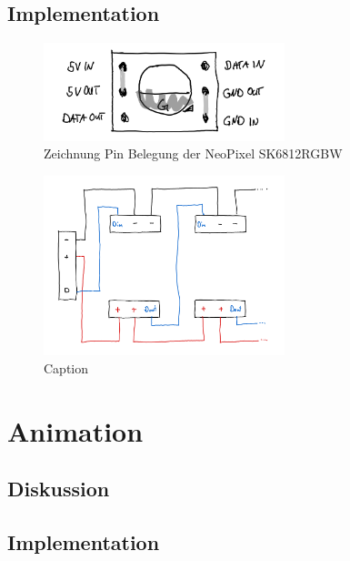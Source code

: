     \subsection{Implementation}

        \begin{figure}[h]
            \begin{center}
                \includegraphics[width=7cm]{media/03_technical_implementation/leds_2.png}
            \end{center}
            \caption{Zeichnung Pin Belegung der NeoPixel SK6812RGBW}
            \label{fig:leds_2}
        \end{figure}
    
        \begin{figure}[h]
            \begin{center}
                \includegraphics[width=7cm]{media/03_technical_implementation/leds_1.png}
            \end{center}
            \caption{Caption}
            \label{fig:leds_1}
        \end{figure}



\section{Animation}
    \subsection{Diskussion}

    \subsection{Implementation}

